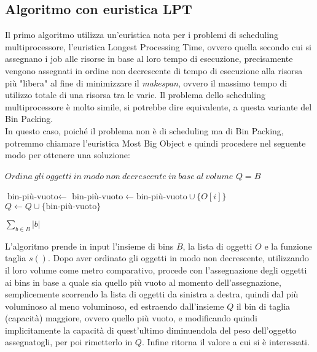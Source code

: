 \subsection{Algoritmo con euristica LPT}
Il primo algoritmo utilizza un'euristica nota per i problemi di scheduling multiprocessore, l'euristica Longest Processing Time, ovvero
quella secondo cui si assegnano i job alle risorse in base al loro tempo di esecuzione, precisamente vengono assegnati in ordine non decrescente di 
tempo di esecuzione alla risorsa più "libera" al fine di minimizzare il \textit{makespan}, ovvero il massimo tempo di utilizzo totale di una risorsa tra le varie.
Il problema dello scheduling multiprocessore è molto simile, si potrebbe dire equivalente, a questa variante del Bin Packing. \\
In questo caso, poiché il problema non è di scheduling ma di Bin Packing, potremmo chiamare l'euristica Most Big Object e quindi procedere nel
seguente modo per ottenere una soluzione:
\begin{algorithm}[H]
\begin{algorithmic}[1]

    \State $ Ordina \: gli \: oggetti \: in \: modo \: non \: decrescente \: in \: base \: al \: volume $
    \State $ Q = B $

        \State $ \text{bin-più-vuoto} \leftarrow $ 
        \State $ \text{bin-più-vuoto} \leftarrow \text{bin-più-vuoto} \cup \{O[i]\} $
        \State $ Q \leftarrow Q \cup \{\text{bin-più-vuoto}\} $
    \EndFor
    
    \State \Return $ \displaystyle\sum\limits_{b \in B} |b| $
\EndFunction

\end{algorithmic}
\end{algorithm}

\noindent
L'algoritmo prende in input l'insieme di bins $ B $, la lista di oggetti $ O $ e la funzione taglia $ s() $. Dopo aver ordinato gli oggetti in modo
non decrescente, utilizzando il loro volume come metro comparativo, procede con l'assegnazione degli oggetti ai bins in base a quale sia quello più
vuoto al momento dell'assegnazione, semplicemente scorrendo la lista di oggetti da sinistra a destra, quindi dal più voluminoso al meno voluminoso, ed estraendo
dall'insieme $ Q $ il bin di taglia (capacità) maggiore, ovvero quello più vuoto, e modificando quindi implicitamente la capacità di quest'ultimo diminuendola
del peso dell'oggetto assegnatogli, per poi rimetterlo in $ Q $. Infine ritorna il valore a cui si è interessati. 

